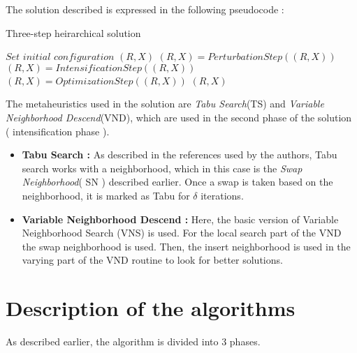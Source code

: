 \documentclass{article}
\begin{document}

The solution described is expressed in the following pseudocode :\\

\begin{algorithm}
\caption{Three-step heirarchical solution}\label{solution_pseudocode}
\begin{algorithmic}[1]
\State $\textit{Set initial configuration }(R,X)$
	\State $(R,X)=\textit{PerturbationStep}((R,X))$
	\State $(R,X)=\textit{IntensificationStep}((R,X))$
	\State $(R,X)=\textit{OptimizationStep}((R,X))$
\EndWhile
\Return $(R,X)$
\end{algorithmic}
\end{algorithm}



The metaheuristics used in the solution are \textit{Tabu Search}(TS) and \textit{Variable Neighborhood Descend}(VND), which are used in the second phase of the solution ( intensification phase ).

\begin{itemize}
\item \textbf{Tabu Search :} As described in the references used by the authors, Tabu search works with a neighborhood, which in this case is the \textit{Swap Neighborhood}( SN ) described earlier. Once a swap is taken based on the neighborhood, it is marked as Tabu for $\delta$ iterations.
\item \textbf{Variable Neighborhood Descend :} Here, the basic version of Variable Neighborhood Search (VNS) is used. For the local search part of the VND the swap neighborhood is used. Then, the insert neighborhood is used in the varying part of the VND routine to look for better solutions.
\end{itemize}


\section{Description of the algorithms}\label{sec:algorithms}%

As described earlier, the algorithm is divided into 3 phases.
\end{document}
